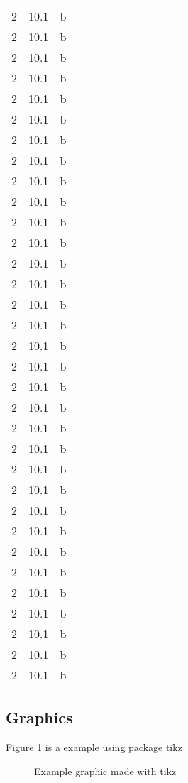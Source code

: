 \documentclass{article}
\begin{document}
\begin{longtable}[c]{l|S|r}
  2 & 10.1 & b\\ 
  2 & 10.1 & b\\ 
  2 & 10.1 & b\\
  2 & 10.1 & b\\
  2 & 10.1 & b\\
  2 & 10.1 & b\\
  2 & 10.1 & b\\
  2 & 10.1 & b\\
  2 & 10.1 & b\\
  2 & 10.1 & b\\
  2 & 10.1 & b\\
  2 & 10.1 & b\\
  2 & 10.1 & b\\
  2 & 10.1 & b\\
  2 & 10.1 & b\\
  2 & 10.1 & b\\ 
  2 & 10.1 & b\\ 
  2 & 10.1 & b\\
  2 & 10.1 & b\\
  2 & 10.1 & b\\
  2 & 10.1 & b\\
  2 & 10.1 & b\\
  2 & 10.1 & b\\
  2 & 10.1 & b\\
  2 & 10.1 & b\\
  2 & 10.1 & b\\
  2 & 10.1 & b\\
  2 & 10.1 & b\\
  2 & 10.1 & b\\
  2 & 10.1 & b\\
  2 & 10.1 & b\\ 
  2 & 10.1 & b\\ 
  2 & 10.1 & b\\
  \bottomrule
\end{longtable}


\subsection{Graphics}
Figure \ref{fig:graphc1} is a example using package tikz

\begin{figure}
    \begin{center}
        \caption{Example graphic made with tikz}
        \label{fig:graphc1}
    \end{center}
\end{figure}
\end{document}
